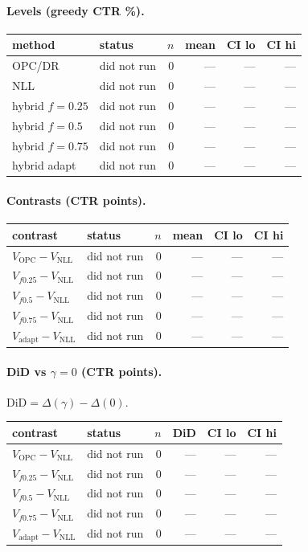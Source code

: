 \documentclass[10pt,a4paper]{article}
\begin{document}
\paragraph{Levels (greedy CTR \%).}
{\centering\small\begin{tabular}{llrrrr}
\toprule method & status & $n$ & mean & CI lo & CI hi \\
\midrule
OPC/DR & did not run & 0 & --- & --- & --- \\
NLL & did not run & 0 & --- & --- & --- \\
hybrid $f{=}0.25$ & did not run & 0 & --- & --- & --- \\
hybrid $f{=}0.5$ & did not run & 0 & --- & --- & --- \\
hybrid $f{=}0.75$ & did not run & 0 & --- & --- & --- \\
hybrid adapt & did not run & 0 & --- & --- & --- \\
\bottomrule\end{tabular}\par}
\paragraph{Contrasts (CTR points).}
{\centering\small\begin{tabular}{llrrrr}
\toprule contrast & status & $n$ & mean & CI lo & CI hi \\
\midrule
$V_{\mathrm{OPC}}-V_{\mathrm{NLL}}$ & did not run & 0 & --- & --- & --- \\
$V_{f0.25}-V_{\mathrm{NLL}}$ & did not run & 0 & --- & --- & --- \\
$V_{f0.5}-V_{\mathrm{NLL}}$ & did not run & 0 & --- & --- & --- \\
$V_{f0.75}-V_{\mathrm{NLL}}$ & did not run & 0 & --- & --- & --- \\
$V_{\mathrm{adapt}}-V_{\mathrm{NLL}}$ & did not run & 0 & --- & --- & --- \\
\bottomrule\end{tabular}\par}
\paragraph{DiD vs $\gamma=0$ (CTR points).} $\mathrm{DiD}=\Delta(\gamma)-\Delta(0)$.
{\centering\small\begin{tabular}{llrrrr}
\toprule contrast & status & $n$ & DiD & CI lo & CI hi \\
\midrule
$V_{\mathrm{OPC}}-V_{\mathrm{NLL}}$ & did not run & 0 & --- & --- & --- \\
$V_{f0.25}-V_{\mathrm{NLL}}$ & did not run & 0 & --- & --- & --- \\
$V_{f0.5}-V_{\mathrm{NLL}}$ & did not run & 0 & --- & --- & --- \\
$V_{f0.75}-V_{\mathrm{NLL}}$ & did not run & 0 & --- & --- & --- \\
$V_{\mathrm{adapt}}-V_{\mathrm{NLL}}$ & did not run & 0 & --- & --- & --- \\
\bottomrule\end{tabular}\par}
\bigskip
\end{document}

